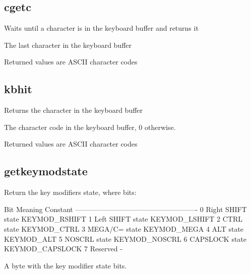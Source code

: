 \subsection{cgetc}
\begin{description}[leftmargin=2cm,style=nextline]
\item [Description:] { Waits until a character is in the keyboard buffer and returns it }
\item [Syntax:] 
\item [Desription:] {The last character in the keyboard buffer }
\item [Notes:] {Returned values are ASCII character codes}
\end{description}

\subsection{kbhit}
\begin{description}[leftmargin=2cm,style=nextline]
\item [Description:] { Returns the character in the keyboard buffer }
\item [Syntax:] 
\item [Desription:] {The character code in the keyboard buffer,  0 otherwise. }
\item [Notes:] {Returned values are ASCII character codes}
\end{description}

\subsection{getkeymodstate}
\begin{description}[leftmargin=2cm,style=nextline]
\item [Description:] { 
   Return the key modifiers state, where bits:

    Bit           Meaning             Constant
    ----------------------------------------------------
    0             Right SHIFT state   KEYMOD\_RSHIFT
    1             Left  SHIFT state   KEYMOD\_LSHIFT
    2             CTRL state          KEYMOD\_CTRL
    3             MEGA/C= state       KEYMOD\_MEGA
    4             ALT state           KEYMOD\_ALT
    5             NOSCRL state        KEYMOD\_NOSCRL
    6             CAPSLOCK state      KEYMOD\_CAPSLOCK
    7             Reserved            -
    }
\item [Syntax:] 
\item [Desription:] {A byte with the key modifier state bits.}
\end{description}

